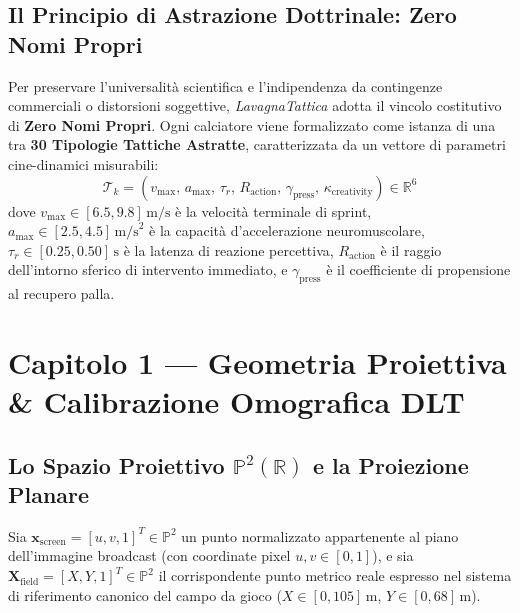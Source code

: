 \documentclass[11pt,a4paper]{article}
\begin{document}
\subsection{Il Principio di Astrazione Dottrinale: Zero Nomi Propri}
Per preservare l'universalità scientifica e l'indipendenza da contingenze commerciali o distorsioni soggettive, \textsl{LavagnaTattica} adotta il vincolo costitutivo di \textbf{Zero Nomi Propri}. Ogni calciatore viene formalizzato come istanza di una tra \textbf{30 Tipologie Tattiche Astratte}, caratterizzata da un vettore di parametri cine-dinamici misurabili:
\begin{equation}
\mathcal{T}_k = \left( v_{\max},\, a_{\max},\, \tau_r,\, R_{\text{action}},\, \gamma_{\text{press}},\, \kappa_{\text{creativity}} \right) \in \mathbb{R}^6
\end{equation}
dove $v_{\max} \in [6.5, 9.8]\,\text{m/s}$ è la velocità terminale di sprint, $a_{\max} \in [2.5, 4.5]\,\text{m/s}^2$ è la capacità d'accelerazione neuromuscolare, $\tau_r \in [0.25, 0.50]\,\text{s}$ è la latenza di reazione percettiva, $R_{\text{action}}$ è il raggio dell'intorno sferico di intervento immediato, e $\gamma_{\text{press}}$ è il coefficiente di propensione al recupero palla.


\section{Capitolo 1 — Geometria Proiettiva \& Calibrazione Omografica DLT}

\subsection{Lo Spazio Proiettivo $\mathbb{P}^2(\mathbb{R})$ e la Proiezione Planare}
Sia $\mathbf{x}_{\text{screen}} = [u, v, 1]^T \in \mathbb{P}^2$ un punto normalizzato appartenente al piano dell'immagine broadcast (con coordinate pixel $u, v \in [0, 1]$), e sia $\mathbf{X}_{\text{field}} = [X, Y, 1]^T \in \mathbb{P}^2$ il corrispondente punto metrico reale espresso nel sistema di riferimento canonico del campo da gioco ($X \in [0, 105]\,\text{m}$, $Y \in [0, 68]\,\text{m}$).
\end{document}
